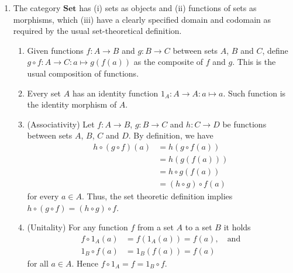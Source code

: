 \begin{example}
\begin{enumerate}[label=\arabic*.]
    \item The category \(\mathbf{Set}\) has (i) sets as objects  and (ii) functions of sets  as morphisms, which (iii) have a clearly specified domain and codomain as required by the usual set-theoretical definition.
    \begin{enumerate}[label=(\roman*),start=4]
        \item %
        Given functions \(f\colon A\to B\) and \(g\colon B\to C\) between sets \(A\), \(B\) and \(C\), define \(g\circ f\colon A\to C:a\mapsto g(f(a))\) as the composite of \(f\) and \(g\). This is the usual composition of functions.
        \item Every set \(A\) has an identity function \(1_A\colon A\to A:a\mapsto a\). Such function is the identity morphism of \(A\).
        \item (Associativity) Let \(f\colon A \to B\), \(g\colon B\to C\) and \(h\colon C\to D\) be functions between sets \(A\), \(B\), \(C\) and \(D\). By definition, we have \vspace{-0.5\baselineskip}\begin{align*}
            h\circ (g\circ f)(a) &=  h(g\circ f (a))\\
                                 &=  h(g( f (a)))\\
                                 &=  h\circ g (f(a))\\
                                 &= (h\circ g) \circ f (a)
        \end{align*}
        for every \(a\in A\). Thus, the set theoretic definition implies \(h\circ (g\circ f) = (h\circ g) \circ f\).
        \item (Unitality) For any function \(f\) from a set \(A\) to a set \(B\) it holds \begin{align*}
            f\circ 1_A (a) &= f(1_A(a)) = f(a),\quad\text{and}\\
            1_B \circ f(a) &= 1_B(f(a)) = f(a)
        \end{align*} for all \(a\in A\). Hence \(f\circ 1_A = f = 1_B \circ f\).
    \end{enumerate}  


\end{enumerate}
\end{example}
